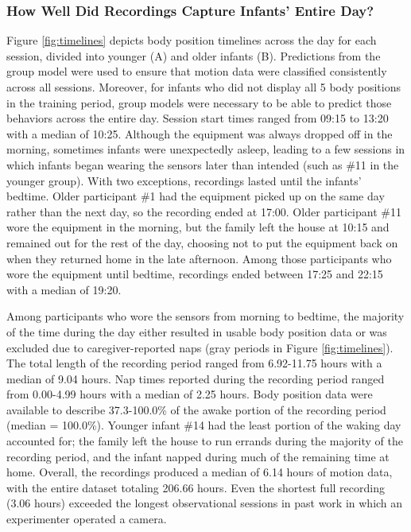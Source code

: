 \documentclass[
  man]{apa6}
\begin{document}
\hypertarget{how-well-did-recordings-capture-infants-entire-day}{%
\subsubsection{How Well Did Recordings Capture Infants' Entire Day?}\label{how-well-did-recordings-capture-infants-entire-day}}

Figure \ref{fig:timelines} depicts body position timelines across the day for each session, divided into younger (A) and older infants (B). Predictions from the group model were used to ensure that motion data were classified consistently across all sessions. Moreover, for infants who did not display all 5 body positions in the training period, group models were necessary to be able to predict those behaviors across the entire day. Session start times ranged from 09:15 to 13:20 with a median of 10:25. Although the equipment was always dropped off in the morning, sometimes infants were unexpectedly asleep, leading to a few sessions in which infants began wearing the sensors later than intended (such as \#11 in the younger group). With two exceptions, recordings lasted until the infants' bedtime. Older participant \#1 had the equipment picked up on the same day rather than the next day, so the recording ended at 17:00. Older participant \#11 wore the equipment in the morning, but the family left the house at 10:15 and remained out for the rest of the day, choosing not to put the equipment back on when they returned home in the late afternoon. Among those participants who wore the equipment until bedtime, recordings ended between 17:25 and 22:15 with a median of 19:20.

Among participants who wore the sensors from morning to bedtime, the majority of the time during the day either resulted in usable body position data or was excluded due to caregiver-reported naps (gray periods in Figure \ref{fig:timelines}). The total length of the recording period ranged from 6.92-11.75 hours with a median of 9.04 hours. Nap times reported during the recording period ranged from 0.00-4.99 hours with a median of 2.25 hours. Body position data were available to describe 37.3-100.0\% of the awake portion of the recording period (median = 100.0\%). Younger infant \#14 had the least portion of the waking day accounted for; the family left the house to run errands during the majority of the recording period, and the infant napped during much of the remaining time at home. Overall, the recordings produced a median of 6.14 hours of motion data, with the entire dataset totaling 206.66 hours. Even the shortest full recording (3.06 hours) exceeded the longest observational sessions in past work in which an experimenter operated a camera.
\end{document}
